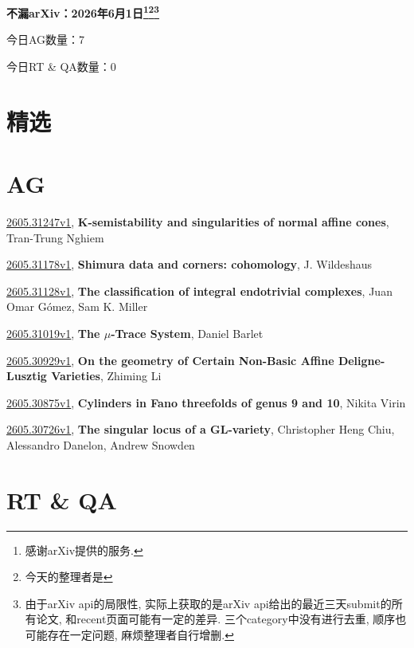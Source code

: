 \documentclass[9pt, a4paper]{article}
\theoremstyle{plain}
\theoremstyle{definition}
\theoremstyle{remark}
\newcommand{\arxiv}[3]{\href{https://arxiv.org/abs/#1}{#1}, \textbf{\textcolor{arxivblue}{#2}}, #3}
\newcommand{\AGnumber}{7}
\newcommand{\RTQAnumber}{0}
\newcommand{\NewestDate}{2026年6月1日}
\newcommand{\todayarXiver}{} %
\begin{document}
\begin{center}
    \Huge\textbf{不漏arXiv：\NewestDate\footnote{感谢arXiv提供的服务.}\footnote{今天的整理者是\todayarXiver}\footnote{由于arXiv api的局限性, 实际上获取的是arXiv api给出的最近三天submit的所有论文, 和recent页面可能有一定的差异. 三个category中没有进行去重, 顺序也可能存在一定问题, 麻烦整理者自行增删.}} \\
\end{center}

\setcounter{section}{-1}

\begin{center}
    今日AG数量：\AGnumber
    
    今日RT \& QA数量：\RTQAnumber
    
\end{center}


\section{精选}


\section{AG}
\arxiv{2605.31247v1}{K-semistability and singularities of normal affine cones}{Tran-Trung Nghiem}

\arxiv{2605.31178v1}{Shimura data and corners: cohomology}{J. Wildeshaus}

\arxiv{2605.31128v1}{The classification of integral endotrivial complexes}{Juan Omar Gómez, Sam K. Miller}

\arxiv{2605.31019v1}{The $μ$-Trace System}{Daniel Barlet}

\arxiv{2605.30929v1}{On the geometry of Certain Non-Basic Affine Deligne-Lusztig Varieties}{Zhiming Li}

\arxiv{2605.30875v1}{Cylinders in Fano threefolds of genus 9 and 10}{Nikita Virin}

\arxiv{2605.30726v1}{The singular locus of a GL-variety}{Christopher Heng Chiu, Alessandro Danelon, Andrew Snowden}


\section{RT \& QA}
\end{document}
